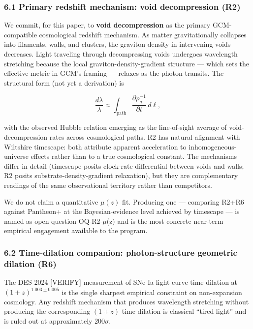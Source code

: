\documentclass[12pt]{article}
\theoremstyle{definition}
\theoremstyle{remark}
\begin{document}
\subsubsection{6.1 Primary redshift mechanism: void decompression
(R2)}\label{primary-redshift-mechanism-void-decompression-r2}

We commit, for this paper, to \textbf{void decompression} as the primary
GCM-compatible cosmological redshift mechanism. As matter
gravitationally collapses into filaments, walls, and clusters, the
graviton density in intervening voids decreases. Light traveling through
decompressing voids undergoes wavelength stretching because the local
graviton-density-gradient structure --- which sets the effective metric
in GCM's framing --- relaxes as the photon transits. The structural form
(not yet a derivation) is

\[\frac{d\lambda}{\lambda} \approx \int_{\text{path}} \frac{\partial \rho_g^{-1}}{\partial t}\,d\ell,\]

with the observed Hubble relation emerging as the line-of-sight average
of void-decompression rates across cosmological paths. R2 has natural
alignment with Wiltshire timescape: both attribute apparent acceleration
to inhomogeneous-universe effects rather than to a true cosmological
constant. The mechanisms differ in detail (timescape posits clock-rate
differential between voids and walls; R2 posits
substrate-density-gradient relaxation), but they are complementary
readings of the same observational territory rather than competitors.

We do not claim a quantitative \(\mu(z)\) fit. Producing one ---
comparing R2+R6 against Pantheon+ at the Bayesian-evidence level
achieved by timescape --- is named as open question OQ-R2-\(\mu\)(z) and
is the most concrete near-term empirical engagement available to the
program.

\subsubsection{6.2 Time-dilation companion: photon-structure geometric
dilation
(R6)}\label{time-dilation-companion-photon-structure-geometric-dilation-r6}

The DES 2024 {[}VERIFY{]} measurement of SNe Ia light-curve time
dilation at \((1+z)^{1.003 \pm 0.005}\) is the single sharpest empirical
constraint on non-expansion cosmology. Any redshift mechanism that
produces wavelength stretching without producing the corresponding
\((1+z)\) time dilation is classical ``tired light'' and is ruled out at
approximately 200\(\sigma\).
\end{document}
